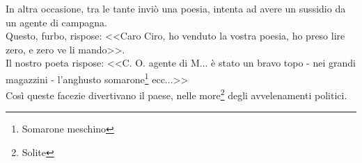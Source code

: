 In altra occasione, tra le tante inviò una poesia, intenta ad avere un sussidio da un agente di campagna. \\
\indent Questo, furbo, rispose: <<Caro Ciro, ho venduto la vostra poesia, ho preso lire zero, e zero ve li mando>>.\\
\indent Il nostro poeta rispose: <<C. O. agente di M... è stato un bravo topo - nei grandi magazzini - l'anghusto somarone\footnote{Somarone meschino} ecc...>>\\
\indent Così queste facezie divertivano il paese, nelle more\footnote{Solite} degli avvelenamenti politici. 

































%
